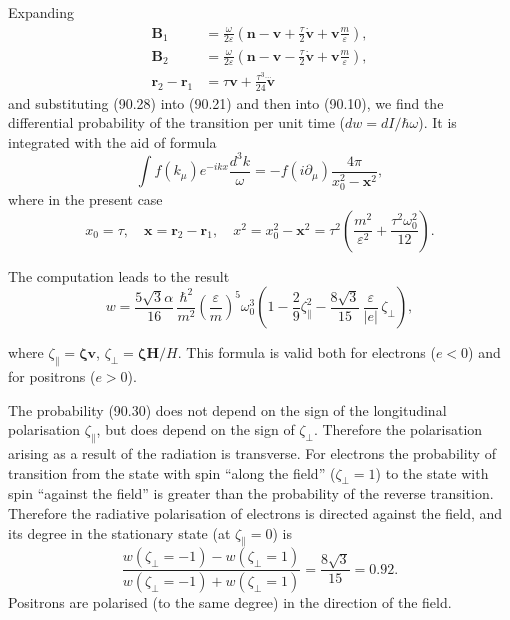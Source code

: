 Expanding
\begin{align*}
\mathbf{B}_1 &= \frac{\omega}{2\varepsilon}\left(\mathbf{n} - \mathbf{v} + \frac{\tau}{2}\dot{\mathbf{v}} + \mathbf{v}\frac{m}{\varepsilon}\right), \\
\mathbf{B}_2 &= \frac{\omega}{2\varepsilon}\left(\mathbf{n} - \mathbf{v} - \frac{\tau}{2}\dot{\mathbf{v}} + \mathbf{v}\frac{m}{\varepsilon}\right), \\
\mathbf{r}_2 - \mathbf{r}_1 &= \tau\mathbf{v} + \frac{\tau^3}{24}\dddot{\mathbf{v}}
\end{align*}
and substituting (90.28) into (90.21) and then into (90.10), we find the differential probability of the transition per unit time ($dw = dI/\hbar\omega$). It is integrated with the aid of formula
\begin{equation}
\int f(k_\mu)e^{-ikx}\frac{d^3k}{\omega} = -f(i\partial_\mu)\frac{4\pi}{x_0^2 - \mathbf{x}^2},
\label{eq:90.29}
\end{equation}
where in the present case
\[
x_0 = \tau, \quad \mathbf{x} = \mathbf{r}_2 - \mathbf{r}_1, \quad x^2 = x_0^2 - \mathbf{x}^2 = \tau^2\left(\frac{m^2}{\varepsilon^2} + \frac{\tau^2\omega_0^2}{12}\right).
\]

The computation leads to the result
\begin{equation}
w = \frac{5\sqrt{3}\alpha}{16}\,\frac{\hbar^2}{m^2}\left(\frac{\varepsilon}{m}\right)^{\!5}\omega_0^3\left(1 - \frac{2}{9}\zeta_\parallel^2 - \frac{8\sqrt{3}}{15}\,\frac{\varepsilon}{|e|}\,\zeta_\perp\right),
\label{eq:90.30}
\end{equation}


where $\zeta_\parallel = \boldsymbol{\zeta}\mathbf{v}$, $\zeta_\perp = \boldsymbol{\zeta}\mathbf{H}/H$. This formula is valid both for electrons ($e < 0$) and for positrons ($e > 0$).

The probability (90.30) does not depend on the sign of the longitudinal polarisation $\zeta_\parallel$, but does depend on the sign of $\zeta_\perp$. Therefore the polarisation arising as a result of the radiation is transverse. For electrons the probability of transition from the state with spin ``along the field'' ($\zeta_\perp = 1$) to the state with spin ``against the field'' is greater than the probability of the reverse transition. Therefore the radiative polarisation of electrons is directed against the field, and its degree in the stationary state (at $\zeta_\parallel = 0$) is
\[
\frac{w(\zeta_\perp = -1) - w(\zeta_\perp = 1)}{w(\zeta_\perp = -1) + w(\zeta_\perp = 1)} = \frac{8\sqrt{3}}{15} = 0.92.
\]
Positrons are polarised (to the same degree) in the direction of the field.
